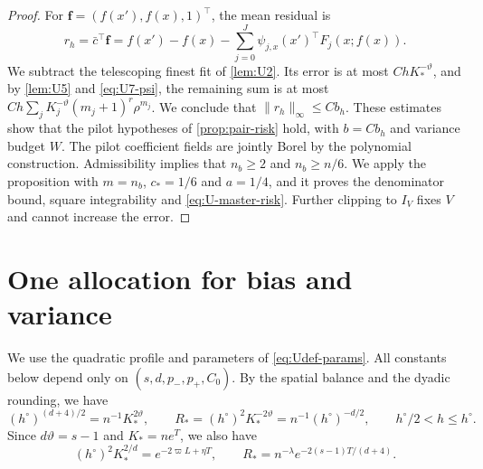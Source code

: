 \begin{proof}
For $\mathbf f=(f(x'),f(x),1)^\top$, the mean residual is
\begin{equation}\label{eq:U8-gbar}
 r_h=\bar c^\top\mathbf f=f(x')-f(x)
       -\sum_{j=0}^J\psi_{j,x}(x')^\top F_j(x;f(x)).
\end{equation}
We subtract the telescoping finest fit of \cref{lem:U2}.
Its error is at most $ChK_*^{-\vartheta}$, and by \cref{lem:U5} and
\eqref{eq:U7-psi}, the remaining sum is at most
$Ch\sum_jK_j^{-\vartheta}(m_j+1)^r\rho^{m_j}$.
We conclude that $\|r_h\|_\infty\le Cb_h$. These estimates show that the
pilot hypotheses of \cref{prop:pair-risk} hold, with $b=Cb_h$ and
variance budget $W$.
The pilot coefficient fields are jointly Borel by the polynomial
construction.
Admissibility implies that $n_b\ge2$ and $n_b\ge n/6$. We apply the
proposition with $m=n_b$, $c_*=1/6$ and $a=1/4$, and it proves the
denominator bound, square integrability and \eqref{eq:U-master-risk}.
Further clipping to $I_V$ fixes $V$ and cannot increase the error.
\end{proof}
\section{One allocation for bias and variance}\label{sec:U-allocation}

We use the quadratic profile and parameters of
\eqref{eq:Udef-params}. All constants below depend only on
$(s,d,p_-,p_+,C_0)$. By the spatial balance and the dyadic rounding, we
have
\begin{equation}\label{eq:Urate-h}
 (h^\circ)^{(d+4)/2}=n^{-1}K_*^{2\vartheta},\qquad
 R_*=(h^\circ)^2K_*^{-2\vartheta}=n^{-1}(h^\circ)^{-d/2},
 \qquad h^\circ/2<h\le h^\circ.
\end{equation}
Since $d\vartheta=s-1$ and $K_*=ne^T$, we also have
\begin{equation}\label{eq:Urate-scale}
 (h^\circ)^2K_*^{2/d}=e^{-2\varpi L+\eta T},\qquad
 R_*=n^{-\lambda}e^{-2(s-1)T/(d+4)}.
\end{equation}

